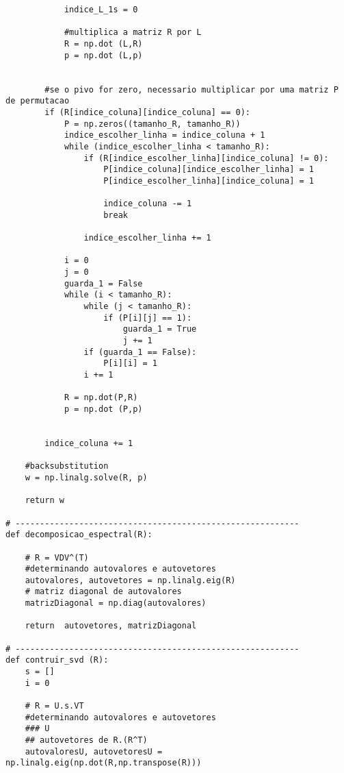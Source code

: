 \documentclass[a4paper,12pt,twoside]{article}
\begin{document}
\begin{lstlisting}
            indice_L_1s = 0
                        
            #multiplica a matriz R por L
            R = np.dot (L,R)
            p = np.dot (L,p)
        
                
        #se o pivo for zero, necessario multiplicar por uma matriz P de permutacao
        if (R[indice_coluna][indice_coluna] == 0):
            P = np.zeros((tamanho_R, tamanho_R))
            indice_escolher_linha = indice_coluna + 1
            while (indice_escolher_linha < tamanho_R):
                if (R[indice_escolher_linha][indice_coluna] != 0):
                    P[indice_coluna][indice_escolher_linha] = 1
                    P[indice_escolher_linha][indice_coluna] = 1
                    
                    indice_coluna -= 1
                    break
                
                indice_escolher_linha += 1
                      
            i = 0
            j = 0
            guarda_1 = False
            while (i < tamanho_R):
                while (j < tamanho_R):
                    if (P[i][j] == 1):
                        guarda_1 = True
                        j += 1
                if (guarda_1 == False):
                    P[i][i] = 1
                i += 1
            
            R = np.dot(P,R)
            p = np.dot (P,p)
            
       
        indice_coluna += 1 
    
    #backsubstitution
    w = np.linalg.solve(R, p)
      
    return w
           
# ----------------------------------------------------------
def decomposicao_espectral(R):
    
    # R = VDV^(T)
    #determinando autovalores e autovetores
    autovalores, autovetores = np.linalg.eig(R) 
    # matriz diagonal de autovalores
    matrizDiagonal = np.diag(autovalores) 
        
    return  autovetores, matrizDiagonal

# ----------------------------------------------------------
def contruir_svd (R):
    s = []
    i = 0
 
    # R = U.s.VT
    #determinando autovalores e autovetores
    ### U
    ## autovetores de R.(R^T)
    autovaloresU, autovetoresU = np.linalg.eig(np.dot(R,np.transpose(R)))
    

\end{lstlisting}
\end{document}
